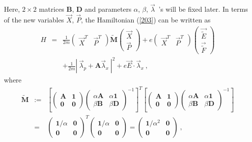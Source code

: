 \documentclass[a4paper,seceq]{ptptex}
\newcommand{\bfA}{ \boldsymbol{A} }
\newcommand{\bfB}{ \boldsymbol{B} }
\newcommand{\bfD}{ \boldsymbol{D} }
\newcommand{\bfM}{ \boldsymbol{M} }
\newcommand{\vecE}{ {\vec E} }
\newcommand{\vecP}{ {\vec P} }
\newcommand{\vecX}{ {\vec X} }
\newcommand{\veclam}{ {\vec \lambda} }
\newcommand{\tilE}{ \tilde{E} }
\newcommand{\tilF}{ \tilde{F} }
\newcommand{\vectilE}{ \vec{\tilE} }
\newcommand{\vectilF}{ \vec{\tilF} }
\newcommand{\tilbfM}{ \tilde{\bfM} }
\newcommand{\DEF}{:=}
\begin{document}
Here, $2\times 2$  matrices $\bfB$, $\bfD$ and
parameters $\alpha $, $\beta $, $\veclam$~'s will be fixed later.
In terms of the new variables $\vec{X}$, $\vec{P}$,
the Hamiltonian (\ref{203}) can be written as
\begin{eqnarray}
  H &=& \frac{1}{2m} \begin{pmatrix} \vecX^T & \vecP^T \end{pmatrix}
         \tilbfM     \begin{pmatrix} \vecX \\ \vecP \end{pmatrix}
       + e \begin{pmatrix} \vecX^T & \vecP^T \end{pmatrix}
           \begin{pmatrix} \vectilE \\ \vectilF \end{pmatrix}
\nonumber \\
 & & + \frac{1}{2m} \left\vert~\veclam_p + \bfA \veclam_x~\right\vert^2
 + e \vecE \cdot \veclam_x~, 
\label{210}
\end{eqnarray}
where
\begin{eqnarray}
 \tilbfM &\DEF&
   \left[ \begin{pmatrix} \bfA & \boldsymbol{1} \\
                \boldsymbol{0} & \boldsymbol{0} \end{pmatrix}
 \begin{pmatrix} \alpha \bfA & \alpha \boldsymbol{1} \\
                  \beta \bfB & \beta \bfD \end{pmatrix}^{-1} \right]^T
   \left[ \begin{pmatrix} \bfA & \boldsymbol{1} \\
                \boldsymbol{0} & \boldsymbol{0} \end{pmatrix}
 \begin{pmatrix} \alpha \bfA & \alpha \boldsymbol{1} \\
                  \beta \bfB & \beta \bfD \end{pmatrix}^{-1} \right]
\label{eq:def-tilbfM} \nonumber  \\
  &=& \begin{pmatrix} \boldsymbol{1}/\alpha & \boldsymbol{0} \\
                             \boldsymbol{0} & \boldsymbol{0}
                                                       \end{pmatrix}^T
      \begin{pmatrix} \boldsymbol{1}/\alpha & \boldsymbol{0} \\
                             \boldsymbol{0} & \boldsymbol{0}
                                                       \end{pmatrix}
   =  \begin{pmatrix} \boldsymbol{1}/\alpha^2 & \boldsymbol{0} \\
                               \boldsymbol{0} & \boldsymbol{0}
                                                       \end{pmatrix}~,
\label{211}
\end{eqnarray}
\end{document}
